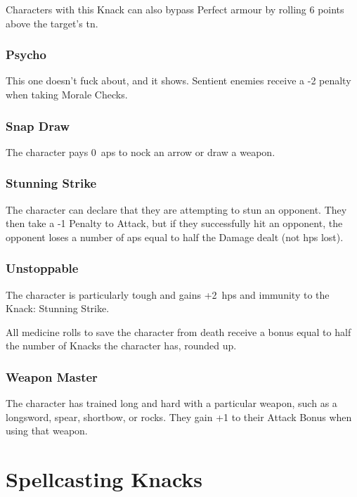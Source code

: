 \begin{multicols}{2}
Characters with this Knack can also bypass Perfect armour by rolling 6 points above the target's \gls{tn}.

\subsubsection{Psycho}

This one doesn't fuck about, and it shows.
Sentient enemies receive a -2 penalty when taking Morale Checks.%

\subsubsection{Snap Draw}

The character pays 0~\glspl{ap} to nock an arrow or draw a weapon.

\subsubsection{Stunning Strike}\label{stunningstrike}

The character can declare that they are attempting to stun an opponent.
They then take a -1 Penalty to Attack, but if they successfully hit an opponent, the opponent loses a number of \glspl{ap} equal to half the Damage dealt (not \glspl{hp} lost).

\subsubsection{Unstoppable}

The character is particularly tough and gains +2~\glspl{hp} and immunity to the Knack: Stunning Strike.

All medicine rolls to save the character from death receive a bonus equal to half the number of Knacks the character has, rounded up.

\subsubsection{Weapon Master}

The character has trained long and hard with a particular weapon, such as a longsword, spear, shortbow, or rocks.
They gain +1 to their Attack Bonus when using that weapon.

\end{multicols}

\section{Spellcasting Knacks}

